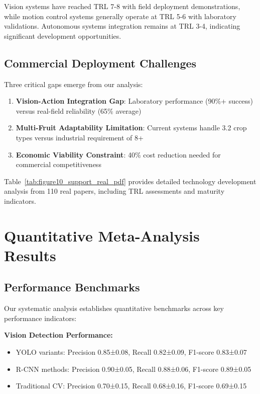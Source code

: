 \documentclass{ieeeaccess}
\begin{document}
Vision systems have reached TRL 7-8 with field deployment demonstrations, while motion control systems generally operate at TRL 5-6 with laboratory validations. Autonomous systems integration remains at TRL 3-4, indicating significant development opportunities.

\subsection{Commercial Deployment Challenges}

Three critical gaps emerge from our analysis:
\begin{enumerate}
\item \textbf{Vision-Action Integration Gap}: Laboratory performance (90\%+ success) versus real-field reliability (65\% average)
\item \textbf{Multi-Fruit Adaptability Limitation}: Current systems handle 3.2 crop types versus industrial requirement of 8+
\item \textbf{Economic Viability Constraint}: 40\% cost reduction needed for commercial competitiveness
\end{enumerate}

Table~\ref{tab:figure10_support_real_pdf} provides detailed technology development analysis from 110 real papers, including TRL assessments and maturity indicators.



\section{Quantitative Meta-Analysis Results}
\label{sec:results}

\subsection{Performance Benchmarks}

Our systematic analysis establishes quantitative benchmarks across key performance indicators:

\textbf{Vision Detection Performance:}
\begin{itemize}
\item YOLO variants: Precision 0.85±0.08, Recall 0.82±0.09, F1-score 0.83±0.07
\item R-CNN methods: Precision 0.90±0.05, Recall 0.88±0.06, F1-score 0.89±0.05
\item Traditional CV: Precision 0.70±0.15, Recall 0.68±0.16, F1-score 0.69±0.15
\end{itemize}
\end{document}
